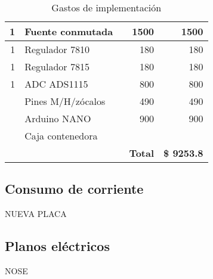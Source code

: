 \begin{table}[h]
\begin{tabular}{|r|l|l|r|r|}
		1 & Fuente conmutada &  & 1500 & 1500 \\ \hline
		1 & Regulador 7810 &  & 180 & 180 \\ \hline
		1 & Regulador 7815 &  & 180 & 180 \\ \hline
		1 & ADC ADS1115 &  & 800 & 800 \\ \hline
		\multicolumn{1}{|l|}{} & Pines M/H/zócalos &  & 490 & 490 \\ \hline
		\multicolumn{1}{|l|}{} & Arduino NANO &  & 900 & 900 \\ \hline
		\multicolumn{1}{|l|}{} & Caja contenedora &  & \multicolumn{1}{l|}{} & \multicolumn{1}{l|}{} \\ \hline
		\multicolumn{4}{|r|}{\textbf{Total}} & \multicolumn{1}{c|}{\textbf{\$ 9253.8}} \\ \hline
	\end{tabular}
\caption{Gastos de implementación}
\label{gastos}

\end{table}

\subsection{Consumo de corriente}
NUEVA PLACA


\subsection{Planos eléctricos}
NOSE
